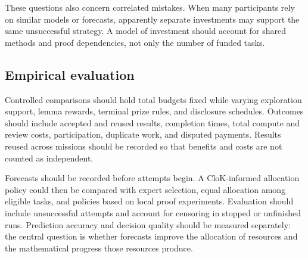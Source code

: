 \documentclass[11pt,a4paper,reqno]{amsart}
\numberwithin{equation}{section}
\begin{document}
These questions also concern correlated mistakes. When many participants rely on similar models or forecasts, apparently separate investments may support the same unsuccessful strategy. A model of investment should account for shared methods and proof dependencies, not only the number of funded tasks.

\subsection{Empirical evaluation}
Controlled comparisons should hold total budgets fixed while varying exploration support, lemma rewards, terminal prize rules, and disclosure schedules. Outcomes should include accepted and reused results, completion times, total compute and review costs, participation, duplicate work, and disputed payments. Results reused across missions should be recorded so that benefits and costs are not counted as independent.

Forecasts should be recorded before attempts begin. A CloK-informed allocation policy could then be compared with expert selection, equal allocation among eligible tasks, and policies based on local proof experiments. Evaluation should include unsuccessful attempts and account for censoring in stopped or unfinished runs. Prediction accuracy and decision quality should be measured separately: the central question is whether forecasts improve the allocation of resources and the mathematical progress those resources produce.
\end{document}
